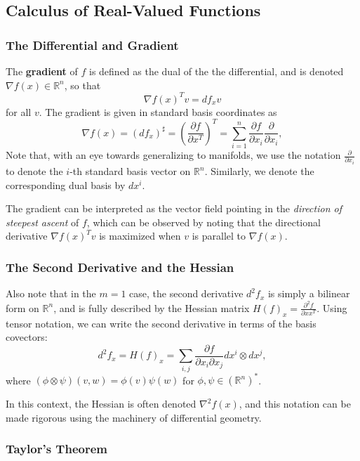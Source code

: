 \documentclass[reqno]{amsart}
\numberwithin{equation}{section}
\begin{document}
\subsection{Calculus of Real-Valued Functions}


\subsubsection{The Differential and Gradient}

The \textbf{gradient} of $f$ is defined as the dual of the the differential,
and is denoted $\nabla f(x) \in \mathbb R^n$, so that
$$
    \nabla f(x)^Tv = df_x v
$$
for all $v$. The gradient is given in standard basis coordinates as
$$
    \nabla f(x) = (df_x)^{\sharp} = \left(\frac{\partial f}{\partial x^T}\right)^T = \sum_{i=1}^n \frac{\partial f}{\partial x_i} \frac{\partial}{\partial x_i},
$$
Note that, with an eye towards generalizing to manifolds, we use the notation $\frac{\partial}{\partial x_i}$ to
denote the $i$-th standard basis vector on $\mathbb R^n$. Similarly, we denote the corresponding dual basis by
$d x^i$.

The gradient can be interpreted as the vector field pointing in the
\emph{direction of steepest ascent} of $f$, which can be observed by noting that the directional
derivative $\nabla f(x)^T v$ is maximized when $v$ is parallel to $\nabla f(x)$.

\subsubsection{The Second Derivative and the Hessian}

Also note that in the $m=1$ case, the second derivative $d^2f_x$ is simply a bilinear form
on $\mathbb R^n$, and is fully described by the Hessian matrix $H(f)_x =
\frac{\partial^2 f}{\partial x x ^T}$. Using tensor notation, we can write the second derivative
in terms of the basis covectors:
$$
    d^2f_x = H(f)_x = \sum_{i,j} \frac{\partial f}{\partial x_i \partial x_j} dx^i \otimes dx^j,
$$
where $(\phi \otimes \psi)(v,w) = \phi(v) \psi(w)$ for $\phi, \psi \in (\mathbb R^n)^*$.

In this context, the Hessian is often denoted $\nabla^2f(x)$, and this notation can be made
rigorous using the machinery of differential geometry.

\subsubsection{Taylor's Theorem}
\end{document}
